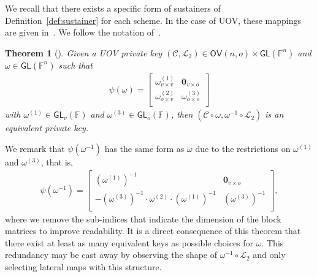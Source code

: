 \documentclass[12pt, a4paper, oneside]{memoir}
\newtheorem{theorem}{Theorem}[section]
\theoremstyle{definition}
\begin{document}
We recall that there exists a specific form of sustainers of Definition~\ref{def:sustainer} for each scheme. In the case of UOV, these mappings are given in~\cite[Sec.~4.3]{Wolf:201104}. We follow the notation of~\cite{Petzoldt:201307}.

\begin{theorem}[{\cite[Thm.~4.15]{Wolf:201104}}]\label{thm:eq-keys-uov}
  Given a UOV private key $(\mathcal{C}, \mathcal{L}_{2}) \in \mathsf{OV}(n, o) \times \mathsf{GL}(\mathbb{F}^{n})$ and $\omega \in \mathsf{GL}(\mathbb{F}^{n})$ such that
  \begin{align}
    \psi(\omega) =
    \begin{bmatrix}
      \omega_{v \times v}^{(1)} & \mathbf{0}_{v \times o} \\
      \omega_{o \times v}^{(2)} & \omega_{o \times o}^{(3)} \\
    \end{bmatrix}
  \end{align}
  with $\omega^{(1)} \in \mathsf{GL}_{v}(\mathbb{F})$ and $\omega^{(3)} \in \mathsf{GL}_{o}(\mathbb{F})$, then $(\mathcal{C} \circ \omega, \omega^{-1} \circ \mathcal{L}_{2})$ is an equivalent private key.
\end{theorem}

We remark that $\psi(\omega^{-1})$ has the same form as $\omega$ due to the restrictions on $\omega^{(1)}$ and $\omega^{(3)}$, that is,
\begin{align}
  \psi(\omega^{-1}) =
  \begin{bmatrix}
    (\omega^{(1)})^{-1}                                                 & \mathbf{0}_{v \times o}   \\
    -(\omega^{(3)})^{-1} \cdot \omega^{(2)} \cdot (\omega^{(1)})^{-1}   & (\omega^{(3)})^{-1}       \\
  \end{bmatrix},
\end{align}
where we remove the sub-indices that indicate the dimension of the block matrices to improve readability. It is a direct consequence of this theorem that there exist at least as many equivalent keys as possible choices for $\omega$. This redundancy may be cast away by observing the shape of $\omega^{-1} \circ \mathcal{L}_{2}$ and only selecting lateral maps with this structure.
\end{document}

